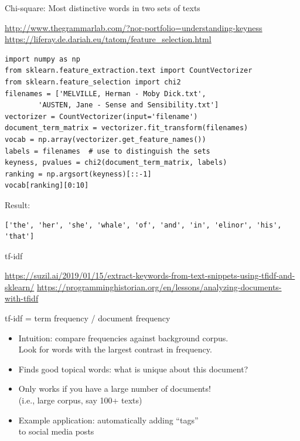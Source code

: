 \documentclass[aspectratio=169,usenames,dvipsnames]{beamer}
\begin{document}
\begin{frame}[fragile]{Chi-square: Most distinctive words in two sets of texts}
    \begin{reference}
        \url{http://www.thegrammarlab.com/?nor-portfolio=understanding-keyness} \\
        \url{https://liferay.de.dariah.eu/tatom/feature_selection.html}
    \end{reference}
\begin{lstlisting}
import numpy as np
from sklearn.feature_extraction.text import CountVectorizer
from sklearn.feature_selection import chi2
filenames = ['MELVILLE, Herman - Moby Dick.txt',
        'AUSTEN, Jane - Sense and Sensibility.txt']
vectorizer = CountVectorizer(input='filename')
document_term_matrix = vectorizer.fit_transform(filenames)
vocab = np.array(vectorizer.get_feature_names())
labels = filenames  # use to distinguish the sets
keyness, pvalues = chi2(document_term_matrix, labels)
ranking = np.argsort(keyness)[::-1]
vocab[ranking][0:10]
\end{lstlisting}
Result:
\begin{lstlisting}
['the', 'her', 'she', 'whale', 'of', 'and', 'in', 'elinor', 'his', 'that']
\end{lstlisting}
\end{frame}

\begin{frame}[fragile]{tf-idf}
\begin{reference}\scriptsize
    \url{https://suzil.ai/2019/01/15/extract-keywords-from-text-snippets-using-tfidf-and-sklearn/}
    \url{https://programminghistorian.org/en/lessons/analyzing-documents-with-tfidf}
\end{reference}
tf-idf = term frequency / document frequency

    \begin{itemize}
        \item Intuition: compare frequencies against background corpus.\\
            Look for words with the largest contrast in frequency.
        \item Finds good topical words: what is unique about this document?
        \item Only works if you have a large number of documents! \\
            (i.e., large corpus, say 100+ texts)
        \item Example application: automatically adding ``tags'' \\
            to social media posts
    \end{itemize}
\end{frame}
\end{document}
